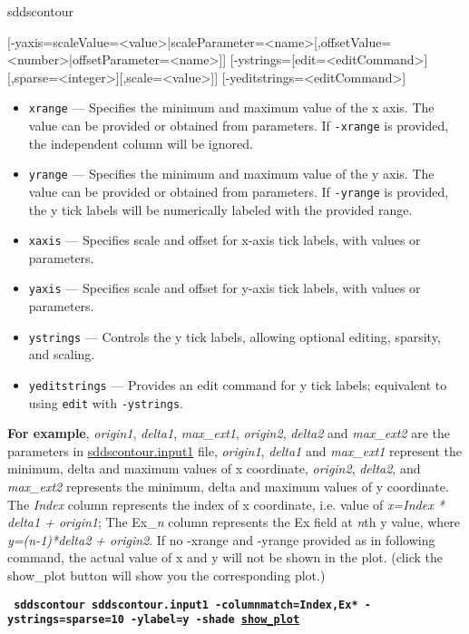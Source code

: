 \begin{sddsprog}{sddscontour}
\begin{itemize}
\begin{flushleft}
{[-yaxis=scaleValue=<value>|scaleParameter=<name>[,offsetValue=<number>|offsetParameter=<name>]]
[-ystrings=[edit=<editCommand>][,sparse=<integer>][,scale=<value>]]
[-yeditstrings=<editCommand>]
}\end{flushleft}
        \begin{itemize}
        \item \verb|xrange| --- Specifies the minimum and maximum value of the x axis. The value can be provided or obtained from parameters.
                If \verb|-xrange| is provided, the independent column will be ignored.
        \item \verb|yrange| --- Specifies the minimum and maximum value of the y axis. The value can be provided or obtained from parameters.
                If \verb|-yrange| is provided, the y tick labels will be numerically labeled with the provided range.
        \item \verb|xaxis| --- Specifies scale and offset for x-axis tick labels, with values or parameters.
        \item \verb|yaxis| --- Specifies scale and offset for y-axis tick labels, with values or parameters.
        \item \verb|ystrings| --- Controls the y tick labels, allowing optional editing, sparsity, and scaling.
        \item \verb|yeditstrings| --- Provides an edit command for y tick labels; equivalent to using \verb|edit| with \verb|-ystrings|.
        \end{itemize}
        {\bf For example}, {\em origin1}, {\em delta1}, {\em max\_ext1}, {\em origin2}, {\em delta2} and {\em max\_ext2} are the
 parameters in \href{https://ops.aps.anl.gov/manuals/example_files/sddscontour.input1}{sddscontour.input1} file, {\em origin1},
 {\em delta1} and {\em max\_ext1} represent the minimum, delta and maximum values of x coordinate, {\em origin2}, {\em delta2}, and {\em max\_ext2} represents the minimum, delta and maximum values of y coordinate. The {\em Index} column represents the index
 of x coordinate, i.e. value of {\em x=Index * delta1 + origin1}; The Ex\_{\em n} column represents the Ex field at {\em n}th y
value, where {\em y=(n-1)*delta2 + origin2}. If no -xrange and -yrange provided as in following command, the actual value of x and y will not be shown in the plot. (click the show\_plot button will show you the corresponding plot.)
       \begin{flushleft}{\tt \bf
            sddscontour sddscontour.input1 -columnmatch=Index,Ex* -ystrings=sparse=10 -ylabel=y -shade
         \href{https://ops.aps.anl.gov/manuals/example_files/sddscontour1_img.html}{show\_plot}
        }\end{flushleft}


\end{itemize}
\end{sddsprog}
